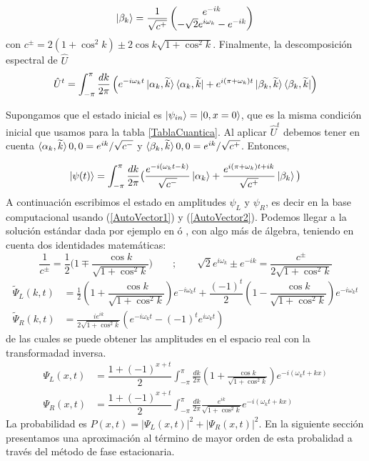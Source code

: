 \begin{appendix}
\begin{align}
    \\
    \ket{\beta_k}=\frac{1}{\sqrt{c^+}}
    \begin{pmatrix}
    e^{-ik}\\
    -\sqrt{2}e^{i\omega_k}-e^{-ik}
    \end{pmatrix}{}
    \label{AutoVector2}
\end{align}{}
con $c^{\pm}=2(1+\cos ^2k)\pm2\cos k\sqrt{1+\cos ^2k}$. Finalmente, la descomposición espectral de $\hat{U}$
\begin{equation}
    \hat{U}^t=\int_{-\pi}^\pi\frac{dk}{2\pi}\left(e^{-i\omega_kt}\ket{\alpha_k,\widetilde{k}}\bra{\alpha_k,\widetilde{k}}+e^{i(\pi+\omega_k)t}\ket{\beta_k,\widetilde{k}}\bra{\beta_k,\widetilde{k}}\right)
\end{equation}{}

Supongamos que el estado inicial es $\ket{\psi_{in}}=\ket{0,x=0}$, que es la misma condición inicial que usamos para la tabla \ref{TablaCuantica}. Al aplicar $\hat{U}^t$ debemos tener en cuenta $\braket{\alpha_k,\widetilde{k}}{0,0}=e^{ik}/\sqrt{c^-}$ y $\braket{\beta_k,\widetilde{k}}{0,0}=e^{ik}/\sqrt{c^+}$. Entonces,

\begin{equation}
\ket{\psi(t)}= \int_{-\pi}^\pi \frac{dk}{2\pi} \big(\frac{e^{-i(\omega_kt-k)}}{\sqrt{c^-}}\ket{\alpha_k}+\frac{e^{i(\pi+\omega_k)t+ik}}{\sqrt{c^+}}\ket{\beta_k}\big)
\end{equation}{}
A continuación escribimos el estado en amplitudes $\psi_L$ y $\psi_R$, es decir en la base computacional usando (\ref{AutoVector1})  y (\ref{AutoVector2}). Podemos llegar a la solución estándar dada por ejemplo en \cite{portugal2013quantum} ó \cite{nayak2000quantum}, con algo más de álgebra, teniendo en cuenta dos identidades matemáticas:
\begin{equation}
    \frac{1}{c^\pm}=\frac{1}{2}\bigg(1\mp\frac{\cos k}{\sqrt{1+\cos ^2k}} \bigg)    \qquad;\qquad \sqrt{2}e^{i\omega_k}\pm e^{-ik}=\frac{c^\pm}{2\sqrt{1+\cos^2{k}}}
\end{equation}{}
\begin{align}
    \widetilde{\Psi}_L(k,t)&=\frac{1}{2}(1+\dfrac{\cos{k}}{\sqrt{1+\cos^2{k}}})e^{-i\omega_kt}+\dfrac{(-1)^t}{2}(1-\dfrac{\cos{k}}{\sqrt{1+\cos^2{k}}})e^{-i\omega_kt}\\
    \widetilde{\Psi}_R(k,t)&=\frac{ie^{ik}}{2\sqrt{1+\cos^2{k}}}(e^{-i\omega_kt}-(-1)^te^{i\omega_kt})
\end{align}{}
de las cuales se puede obtener las amplitudes en el espacio real con la transformadad inversa.
\begin{align}
    \Psi_L(x,t)&=\dfrac{1+(-1)^{x+t}}{2}\int_{-\pi}^\pi\frac{dk}{2\pi}(1+\frac{\cos k}{\sqrt{1+\cos^2 k}})e^{-i(\omega_kt+kx)}
    \label{ec:AmplitudIzquierda}\\
    \Psi_R(x,t)&=\dfrac{1+(-1)^{x+t}}{2}\int_{-\pi}^\pi\frac{dk}{2\pi}\frac{e^{ik}}{\sqrt{1+\cos^2 k}}e^{-i(\omega_kt+kx)}
    \label{ec:AmplitudDerecha}
\end{align}{}
La probabilidad es $P(x,t)=|\Psi_L(x,t)|^2+|\Psi_R(x,t)|^2$. En la siguiente sección presentamos una aproximación al término de mayor orden de esta probalidad a través del método de fase estacionaria.


\end{appendix}
